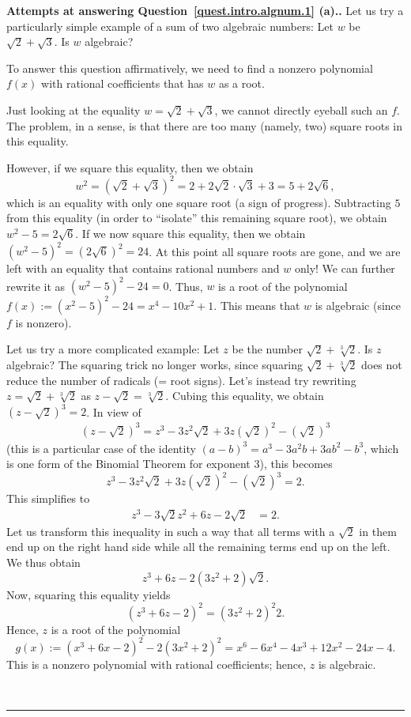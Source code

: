 \documentclass[numbers=enddot,12pt,final,onecolumn,notitlepage]{scrartcl}%
\numberwithin{exer}{section}
\theoremstyle{definition}
\newenvironment{proof}[1][Proof]{\noindent\textbf{#1.} }{\ \rule{0.5em}{0.5em}}
\newcommand{\tup}[1]{\left( #1 \right)}
\begin{document}
\begin{proof}[Attempts at answering Question~\ref{quest.intro.algnum.1} \textbf{(a)}.]
Let us try a particularly simple example of a sum of two algebraic numbers:
Let $w$ be $\sqrt{2} + \sqrt{3}$.
Is $w$ algebraic?

To answer this question affirmatively, we need to find a nonzero polynomial
$f\tup{x}$ with rational coefficients that has $w$ as a root.

Just looking at the equality $w = \sqrt{2} + \sqrt{3}$, we cannot directly
eyeball such an $f$. The problem, in a sense, is that there are too many
(namely, two) square roots in this equality.

However, if we square this equality, then we obtain
\[
w^{2}=\left(  \sqrt{2}+\sqrt{3}\right)  ^{2}=2+2\sqrt{2}\cdot \sqrt{3}+3
=5+2\sqrt{6},
\]
which is an equality with only one square root (a sign of progress).
Subtracting $5$ from this equality (in order to ``isolate'' this remaining
square root), we obtain $w^{2}-5=2\sqrt{6}$.
If we now square this equality, then we obtain
$\left(  w^{2}-5\right)  ^{2}=\left( 2\sqrt{6}\right)  ^{2}=24$.
At this point all square roots are gone, and we are left with an equality
that contains rational numbers and $w$ only!
We can further rewrite it as
$\tup{w^2 - 5}^2 - 24 = 0$.
Thus, $w$ is a root of the polynomial
$f\tup{x} := \left(  x^{2}-5\right)^{2}-24 = x^{4}-10x^{2}+1$.
This means that $w$ is algebraic (since $f$ is nonzero).

Let us try a more complicated example:
Let $z$ be the number $\sqrt{2}+\sqrt[3]{2}$.
Is $z$ algebraic?
The squaring trick no longer works, since squaring $\sqrt{2} + \sqrt[3]{2}$
does not reduce the number of radicals (= root signs).
Let's instead try rewriting $z = \sqrt{2} + \sqrt[3]{2}$ as
$z-\sqrt{2}=\sqrt[3]{2}$. Cubing this equality, we obtain
$\left(  z-\sqrt{2}\right)  ^{3}  =2$.
In view of
\begin{align*}
\left(  z-\sqrt{2}\right)  ^{3}
=
z^{3}-3z^{2}\sqrt{2}+3z\left(  \sqrt{2}\right)  ^{2}-\left(  \sqrt{2}\right)
^{3}
\end{align*}
(this is a particular case of the identity
$\left(  a-b\right)  ^{3}=a^{3}-3a^{2}b+3ab^{2}-b^{3}$, which is one form
of the Binomial Theorem for exponent $3$), this becomes
\[
 z^{3}-3z^{2}\sqrt{2}+3z\left(  \sqrt{2}\right)  ^{2}-\left(  \sqrt{2}\right)
^{3}
 = 2.
\]
This simplifies to%
\begin{align*}
z^{3}-3\sqrt{2}z^{2}+6z-2\sqrt{2}  & =2.
\end{align*}
Let us transform this inequality in such a way that all terms with a
$\sqrt{2}$ in them end up on the right hand side while all the remaining
terms end up on the left.
We thus obtain
\[
 z^{3}+6z-2 \left(  3z^{2}+2\right)  \sqrt{2} .
\]
Now, squaring this equality yields
\[
\left(  z^{3}+6z-2\right)  ^{2}=\left(  3z^{2}+2\right)  ^{2}2.
\]
Hence, $z$ is a root of the polynomial
\[
 g\tup{x} := \left(  x^{3}+6x-2\right)  ^{2}-2\left(  3x^{2}+2\right)  ^{2}=x^{6}%
-6x^{4}-4x^{3}+12x^{2}-24x-4.
\]
This is a nonzero polynomial with rational coefficients; hence, $z$
is algebraic.


\end{proof}
\end{document}
